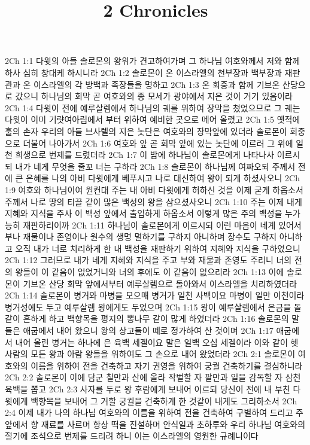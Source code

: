 

\title{2 Chronicles}

2Ch 1:1  다윗의 아들 솔로몬의 왕위가 견고하여가며 그 하나님 여호와께서 저와 함께하사 심히 창대케 하시니라
2Ch 1:2  솔로몬이 온 이스라엘의 천부장과 백부장과 재판관과 온 이스라엘의 각 방백과 족장들을 명하고
2Ch 1:3  온 회중과 함께 기브온 산당으로 갔으니 하나님의 회막 곧 여호와의 종 모세가 광야에서 지은 것이 거기 있음이라
2Ch 1:4  다윗이 전에 예루살렘에서 하나님의 궤를 위하여 장막을 쳤었으므로 그 궤는 다윗이 이미 기럇여아림에서 부터 위하여 예비한 곳으로 메어 올렸고
2Ch 1:5  옛적에 훌의 손자 우리의 아들 브사렐의 지은 놋단은 여호와의 장막앞에 있더라 솔로몬이 회중으로 더불어 나아가서
2Ch 1:6  여호와 앞 곧 회막 앞에 있는 놋단에 이르러 그 위에 일천 희생으로 번제를 드렸더라
2Ch 1:7  이 밤에 하나님이 솔로몬에게 나타나사 이르시되 내가 네게 무엇을 줄꼬 너는 구하라
2Ch 1:8  솔로몬이 하나님께 여짜오되 주께서 전에 큰 은혜를 나의 아비 다윗에게 베푸시고 나로 대신하여 왕이 되게 하셨사오니
2Ch 1:9  여호와 하나님이여 원컨대 주는 내 아비 다윗에게 허하신 것을 이제 굳게 하옵소서 주께서 나로 땅의 티끌 같이 많은 백성의 왕을 삼으셨사오니
2Ch 1:10  주는 이제 내게 지혜와 지식을 주사 이 백성 앞에서 출입하게 하옵소서 이렇게 많은 주의 백성을 누가 능히 재판하리이까
2Ch 1:11  하나님이 솔로몬에게 이르시되 이런 마음이 네게 있어서 부나 재물이나 존영이나 원수의 생명 멸하기를 구하지 아니하며 장수도 구하지 아니하고 오직 내가 너로 치리하게 한 내 백성을 재판하기 위하여 지혜와 지식을 구하였으니
2Ch 1:12  그러므로 내가 네게 지혜와 지식을 주고 부와 재물과 존영도 주리니 너의 전의 왕들이 이 같음이 없었거니와 너의 후에도 이 같음이 없으리라
2Ch 1:13  이에 솔로몬이 기브온 산당 회막 앞에서부터 예루살렘으로 돌아와서 이스라엘을 치리하였더라
2Ch 1:14  솔로몬이 병거와 마병을 모으매 병거가 일천 사백이요 마병이 일만 이천이라 병거성에도 두고 예루살렘 왕에게도 두었으며
2Ch 1:15  왕이 예루살렘에서 은금을 돌 같이 흔하게 하고 백향목을 평지의 뽕나무 같이 많게 하였더라
2Ch 1:16  솔로몬의 말들은 애굽에서 내어 왔으니 왕의 상고들이 떼로 정가하여 산 것이며
2Ch 1:17  애굽에서 내어 올린 병거는 하나에 은 육백 세겔이요 말은 일백 오십 세겔이라 이와 같이 헷 사람의 모든 왕과 아람 왕들을 위하여도 그 손으로 내어 왔었더라
2Ch 2:1  솔로몬이 여호와의 이름을 위하여 전을 건축하고 자기 권영을 위하여 궁궐 건축하기를 결심하니라
2Ch 2:2  솔로몬이 이에 담군 칠만과 산에 올라 작벌할 자 팔만과 일을 감독할 자 삼천 육백을 뽑고
2Ch 2:3  사자를 두로 왕 후람에게 보내어 이르되 당신이 전에 내 부친 다윗에게 백향목을 보내어 그 거할 궁궐을 건축하게 한 것같이 내게도 그리하소서
2Ch 2:4  이제 내가 나의 하나님 여호와의 이름을 위하여 전을 건축하여 구별하여 드리고 주 앞에서 향 재료를 사르며 항상 떡을 진설하며 안식일과 초하루와 우리 하나님 여호와의 절기에 조석으로 번제를 드리려 하니 이는 이스라엘의 영원한 규례니이다
